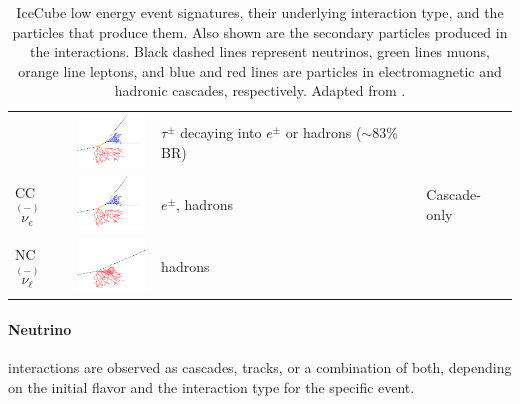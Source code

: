 \begin{table}[h]
\begin{center}
\begin{tabular}{ m{1.8cm} m{2.0cm} m{3.0cm} m{1.8cm} }
            \cmidrule{2-4}

            & \includegraphics[width=2cm]{figures/neutrinos_properties/interaction_schematics/nutau_CC_cascadeonly.pdf}
            & $\tau^\pm$ decaying into $e^\pm$ or hadrons ($\sim$83\% BR)  
            & \\

            \cmidrule{1-3} CC $\overset{(-)}{\nu_e}$ 
            & \includegraphics[width=2cm]{figures/neutrinos_properties/interaction_schematics/nue_CC_cascadeonly.pdf}
            & $e^\pm$, hadrons & {Cascade-only} \\

            \cmidrule{1-3}

            NC $\overset{(-)}{\nu_\ell}$ 
            & \includegraphics[width=2cm]{figures/neutrinos_properties/interaction_schematics/nuall_NC_cascadeonly.pdf} 
            & hadrons & \\

            \hline
        \end{tabular}
    \end{center}
    \caption[IceCube low energy event signatures and underlying interactions]{IceCube low energy event signatures, their underlying interaction type, and the particles that produce them. Also shown are the secondary particles produced in the interactions. Black dashed lines represent neutrinos, green lines muons, orange line leptons, and blue and red lines are particles in electromagnetic and hadronic cascades, respectively. Adapted from \cite{ATerliuk}.}
\end{table}


\paragraph{Neutrino} interactions are observed as cascades, tracks, or a combination of both, depending on the initial flavor and the interaction type for the specific event.

